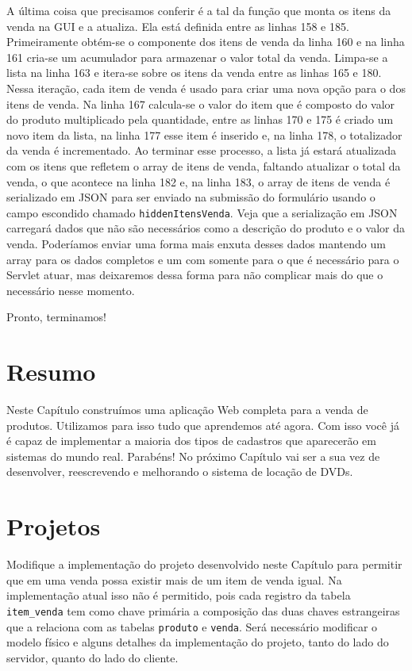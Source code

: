 A última coisa que precisamos conferir é a tal da função que monta os itens da venda na GUI e a atualiza. Ela está definida entre as linhas 158 e 185. Primeiramente obtém-se o componente dos itens de venda da linha 160 e na linha 161 cria-se um acumulador para armazenar o valor total da venda. Limpa-se a lista na linha 163 e itera-se sobre os itens da venda entre as linhas 165 e 180. Nessa iteração, cada item de venda é usado para criar uma nova opção para o  dos itens de venda. Na linha 167 calcula-se o valor do item que é composto do valor do produto multiplicado pela quantidade, entre as linhas 170 e 175 é criado um novo item da lista, na linha 177 esse item é inserido e, na linha 178, o totalizador da venda é incrementado. Ao terminar esse processo, a lista já estará atualizada com os itens que refletem o array de itens de venda, faltando atualizar o total da venda, o que acontece na linha 182 e, na linha 183, o array de itens de venda é serializado em JSON para ser enviado na submissão do formulário usando o campo escondido chamado \texttt{hiddenItensVenda}. Veja que a serialização em JSON carregará dados que não são necessários como a descrição do produto e o valor da venda. Poderíamos enviar uma forma mais enxuta desses dados mantendo um array para os dados completos e um com somente para o que é necessário para o Servlet atuar, mas deixaremos dessa forma para não complicar mais do que o necessário nesse momento.

Pronto, terminamos!


\section{Resumo}

Neste Capítulo construímos uma aplicação Web completa para a venda de produtos. Utilizamos para isso tudo que aprendemos até agora. Com isso você já é capaz de implementar a maioria dos tipos de cadastros que aparecerão em sistemas do mundo real. Parabéns! No próximo Capítulo vai ser a sua vez de desenvolver, reescrevendo e melhorando o sistema de locação de DVDs. 


\section{Projetos}

\begin{projetoSemArquivo}{}{}{}
    Modifique a implementação do projeto desenvolvido neste Capítulo para permitir que em uma venda possa existir mais de um item de venda igual. Na implementação atual isso não é permitido, pois cada registro da tabela \texttt{item\_venda} tem como chave primária a composição das duas chaves estrangeiras que a relaciona com as tabelas \texttt{produto} e \texttt{venda}. Será necessário modificar o modelo físico e alguns detalhes da implementação do projeto, tanto do lado do servidor, quanto do lado do cliente.
\end{projetoSemArquivo}


